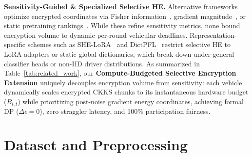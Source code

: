 \documentclass[acmtog,nonacm]{acmart}
\begin{document}
\textbf{Sensitivity-Guided \& Specialized Selective HE.}
Alternative frameworks optimize encrypted coordinates via Fisher information~\cite{li2025selectiveshield,yao2026fedfihe,liu2026fisher}, gradient magnitude~\cite{li2025sensecrypt}, or static pretraining rankings~\cite{jin2023fedmlhe}. While these refine sensitivity metrics, none bound encryption volume to dynamic per-round vehicular deadlines. Representation-specific schemes such as SHE-LoRA~\cite{liu2026shelora} and DictPFL~\cite{xue2025dictpfl} restrict selective HE to LoRA adapters or static global dictionaries, which break down under general classifier heads or non-IID driver distributions. As summarized in Table~\ref{tab:related_work}, our \textbf{Compute-Budgeted Selective Encryption Extension} uniquely decouples encryption volume from sensitivity: each vehicle dynamically scales encrypted CKKS chunks to its instantaneous hardware budget ($B_{i,t}$) while prioritizing post-noise gradient energy coordinates, achieving formal DP ($\Delta\epsilon=0$), zero straggler latency, and 100\% participation fairness.

\begin{table}[t]
\centering
\caption{Comparison of representative selective HE frameworks.}
\label{tab:related_work}
\end{table}

\section{Dataset and Preprocessing}
\label{sec:dataset}
\end{document}

